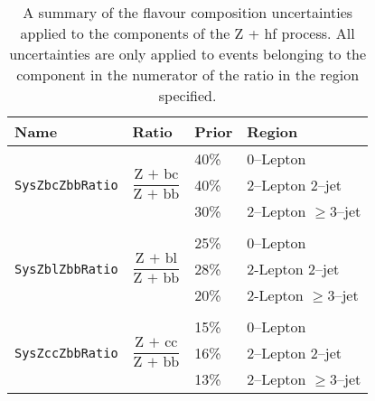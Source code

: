 \begin{table}[!htbp]
  \centering
  \begin{tabular}{llll}
    \toprule
    {\bfseries Name} & {\bfseries Ratio} & {\bfseries Prior} & {\bfseries Region}\\ 
    \midrule
    \multirow{ 3}{*}{\texttt{SysZbcZbbRatio}} & \multirow{ 3}{*}{$\dfrac{\text{Z + bc}}{\text{Z + bb}}$} & 40\% & 0--Lepton \\
                     &								    & 40\% & 2--Lepton 2--jet \\
                     &								    & 30\% & 2--Lepton $\geq$3--jet \\
                     & & & \\
    \multirow{ 3}{*}{\texttt{SysZblZbbRatio}} & \multirow{ 3}{*}{$\dfrac{\text{Z + bl}}{\text{Z + bb}}$} & 25\% & 0--Lepton \\
                     &								    & 28\% & 2-Lepton 2--jet \\
                     &								    & 20\% & 2-Lepton $\geq$3--jet \\
                     & & & \\
    \multirow{ 3}{*}{\texttt{SysZccZbbRatio}}    & \multirow{ 3}{*}{$\dfrac{\text{Z + cc}}{\text{Z + bb}}$} & 15\% & 0--Lepton \\
                     &								    &  16\% & 2--Lepton 2--jet \\
                     &								    &   13\% & 2--Lepton $\geq$3--jet \\
    \bottomrule
  \end{tabular}
  \caption{A summary of the flavour composition uncertainties applied to the
    components of the Z + hf process. All uncertainties are only applied to
    events belonging to the component in the numerator of the ratio in the
    region specified.}
  \label{tab:zjets-flavour-comp}
\end{table}